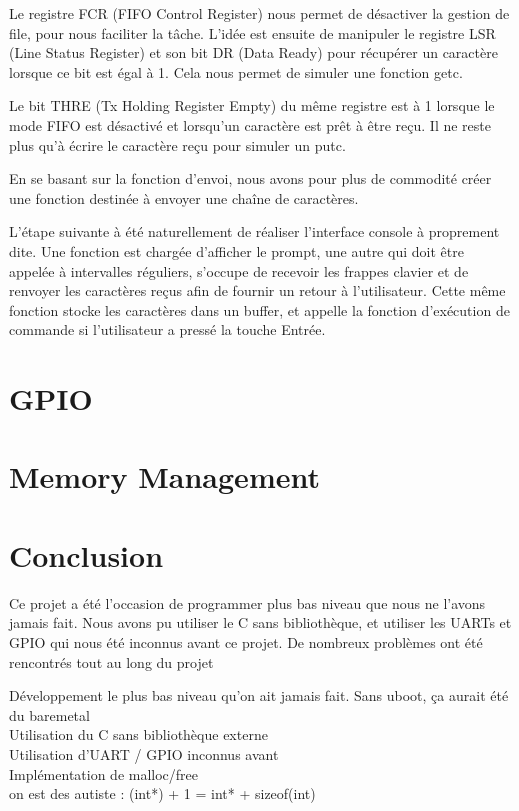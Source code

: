 \documentclass[frenchb]{article}
\begin{document}
Le registre FCR (FIFO Control Register) nous permet de désactiver la gestion de file, pour nous faciliter la tâche.
L'idée est ensuite de manipuler le registre LSR (Line Status Register) et son bit DR (Data Ready) pour récupérer un caractère lorsque ce bit est égal à 1. Cela nous permet de simuler une fonction \textsf{getc}.

 Le bit THRE (Tx Holding Register Empty) du même registre est à 1 lorsque le mode FIFO est désactivé et lorsqu'un caractère est prêt à être reçu. Il ne reste plus qu'à écrire le caractère reçu pour simuler un \textsf{putc}.

En se basant sur la fonction d'envoi, nous avons pour plus de commodité créer une fonction destinée à envoyer une chaîne de caractères.

L'étape suivante à été naturellement de réaliser l'interface console à proprement dite. Une fonction est chargée d'afficher le prompt, une autre qui doit être appelée à intervalles réguliers, s'occupe de recevoir les frappes clavier et de renvoyer les caractères reçus afin de fournir un retour à l'utilisateur. Cette même fonction stocke les caractères dans un buffer, et appelle la fonction d'exécution de commande si l'utilisateur a pressé la touche Entrée.

%
\section{GPIO}

\section{Memory Management}

\clearpage

\section*{Conclusion}

\noindent Ce projet a été l'occasion de programmer plus bas niveau que nous ne l'avons jamais fait. Nous avons pu utiliser le C sans bibliothèque, et utiliser les UARTs et GPIO qui nous été inconnus avant ce projet.
De nombreux problèmes ont été rencontrés tout au long du projet

Développement le plus bas niveau qu'on ait jamais fait. Sans uboot, ça aurait été du baremetal\\
Utilisation du C sans bibliothèque externe\\
Utilisation d'UART / GPIO inconnus avant\\
Implémentation de malloc/free\\
on est des autiste : (int*) + 1 = int* + sizeof(int)\\
\end{document}
